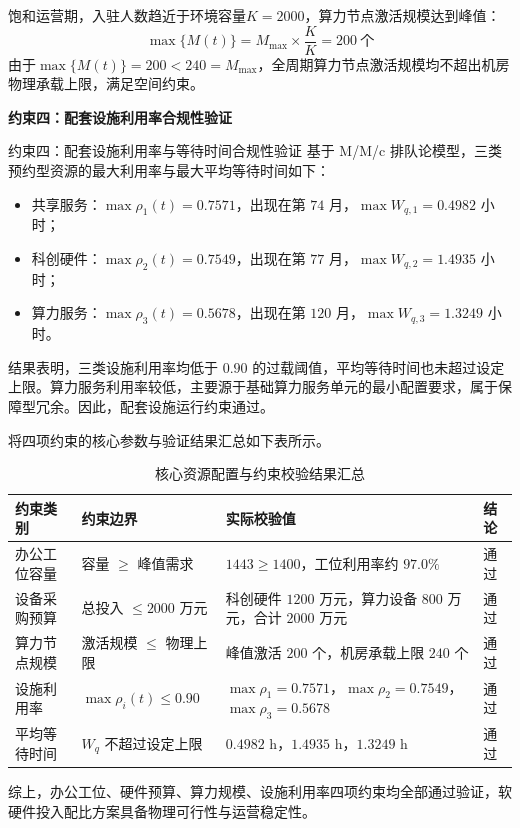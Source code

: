 \documentclass[12pt,a4paper]{article}
\begin{document}
饱和运营期，入驻人数趋近于环境容量$K=2000$，算力节点激活规模达到峰值：
\[
\max\{M(t)\} = M_{\text{max}} \times \frac{K}{K} = 200 \ \text{个}
\]
由于$\max\{M(t)\} = 200 < 240 = M_{\text{max}}$，全周期算力节点激活规模均不超出机房物理承载上限，满足空间约束。

\vspace{1em}
\textbf{约束四：配套设施利用率合规性验证}

约束四：配套设施利用率与等待时间合规性验证 基于 M/M/c 排队论模型，三类预约型资源的最大利用率与最大平均等待时间如下： 
\begin{itemize} 
    \item 共享服务：$\max \rho_1(t)=0.7571$，出现在第 $74$ 月，$\max W_{q,1}=0.4982$ 小时； 
    \item 科创硬件：$\max \rho_2(t)=0.7549$，出现在第 $77$ 月，$\max W_{q,2}=1.4935$ 小时； 
    \item 算力服务：$\max \rho_3(t)=0.5678$，出现在第 $120$ 月，$\max W_{q,3}=1.3249$ 小时。 
\end{itemize} 
结果表明，三类设施利用率均低于 $0.90$ 的过载阈值，平均等待时间也未超过设定上限。算力服务利用率较低，主要源于基础算力服务单元的最小配置要求，属于保障型冗余。因此，配套设施运行约束通过。

将四项约束的核心参数与验证结果汇总如下表所示。

\begin{table}[H] 
\centering \small \caption{核心资源配置与约束校验结果汇总} 
\renewcommand{\arraystretch}{1.2} 
\begin{tabular}{p{3.0cm}p{3.2cm}p{4.5cm}p{1.5cm}} 
\toprule 约束类别 & 约束边界 & 实际校验值 & 结论 \\ 
\midrule 办公工位容量 & 容量 $\geq$ 峰值需求 & $1443\geq1400$，工位利用率约 $97.0\%$ & 通过 \\ 设备采购预算 & 总投入 $\leq2000$ 万元 & 科创硬件 $1200$ 万元，算力设备 $800$ 万元，合计 $2000$ 万元 & 通过 \\ 算力节点规模 & 激活规模 $\leq$ 物理上限 & 峰值激活 $200$ 个，机房承载上限 $240$ 个 & 通过 \\ 设施利用率 & $\max \rho_i(t)\leq0.90$ & $\max\rho_1=0.7571$，$\max\rho_2=0.7549$，$\max\rho_3=0.5678$ & 通过 \\ 平均等待时间 & $W_q$ 不超过设定上限 & $0.4982$ h，$1.4935$ h，$1.3249$ h & 通过 \\ \bottomrule \end{tabular} \end{table}


综上，办公工位、硬件预算、算力规模、设施利用率四项约束均全部通过验证，软硬件投入配比方案具备物理可行性与运营稳定性。
\end{document}
